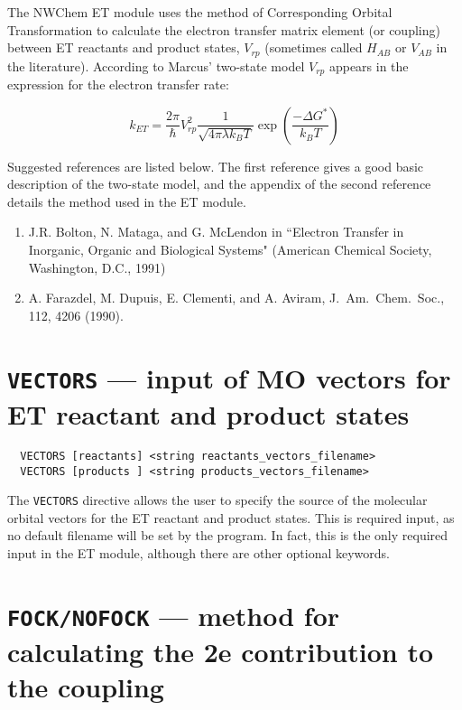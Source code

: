 \label{sec:etrans}

The NWChem ET module uses the method of Corresponding Orbital Transformation to calculate the
electron transfer matrix element (or coupling) between ET reactants and product states,
$V_{rp}$ (sometimes called $H_{AB}$ or $V_{AB}$ in the literature). According to Marcus' two-state model $V_{rp}$ appears in the
expression for the electron transfer rate:

\begin{equation} 
{k_{ET}}=
\frac{2\pi}{\hbar}
V_{rp}^{2}
\frac{1}{\sqrt{4\pi \lambda k_{B}T}}
\exp \left( \frac{- \Delta G^{*}}{k_{B} T} \right)
\end{equation}


Suggested references are listed below.  The first reference gives a good basic description 
of the two-state model, and the appendix of the second reference details the method used
in the ET module.

\begin{enumerate}
\item J.R. Bolton, N. Mataga, and G. McLendon in ``Electron Transfer in Inorganic, Organic and Biological Systems"
(American Chemical Society, Washington, D.C., 1991)
\item A. Farazdel, M. Dupuis, E. Clementi, and A. Aviram, 
J.~Am.~Chem.~Soc., 112, 4206 (1990).
\end{enumerate}

\section{{\tt VECTORS} --- input of MO vectors for ET reactant and product states}
\label{sec:vectors}


\begin{verbatim}
  VECTORS [reactants] <string reactants_vectors_filename>
  VECTORS [products ] <string products_vectors_filename>
\end{verbatim}

The \verb+VECTORS+ directive allows the user to specify the source 
of the molecular orbital vectors for the ET reactant and product states. 
This is required input, as no default filename will be set by the program.
In fact, this is the only required input in the ET module, although there are
other optional keywords.



\section{{\tt FOCK/NOFOCK} --- method for calculating the 2e contribution to the coupling}
\label{sec:fock}


